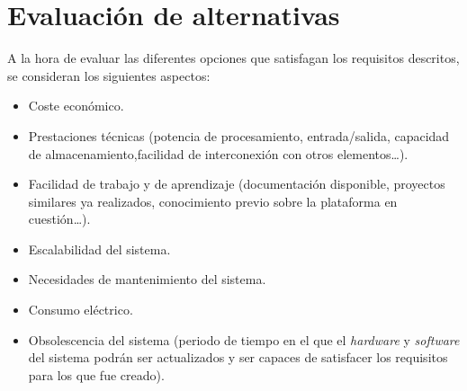 \section{Evaluación de alternativas}
\label{alternativas}
A la hora de evaluar las diferentes opciones que satisfagan los requisitos descritos, se consideran los siguientes aspectos:

\begin{itemize}
  \item Coste económico.
  \item Prestaciones técnicas (potencia de procesamiento, entrada/salida, capacidad de almacenamiento,facilidad de interconexión con otros elementos\dots).
  \item Facilidad de trabajo y de aprendizaje (documentación disponible, proyectos similares ya realizados, conocimiento previo sobre la plataforma en cuestión\dots).
  \item Escalabilidad del sistema.
  \item Necesidades de mantenimiento del sistema.
  \item Consumo eléctrico.
  \item Obsolescencia del sistema (periodo de tiempo en el que el \textit{hardware} y \textit{software} del sistema podrán ser actualizados y ser capaces de satisfacer los requisitos para los que fue creado).
\end{itemize}

